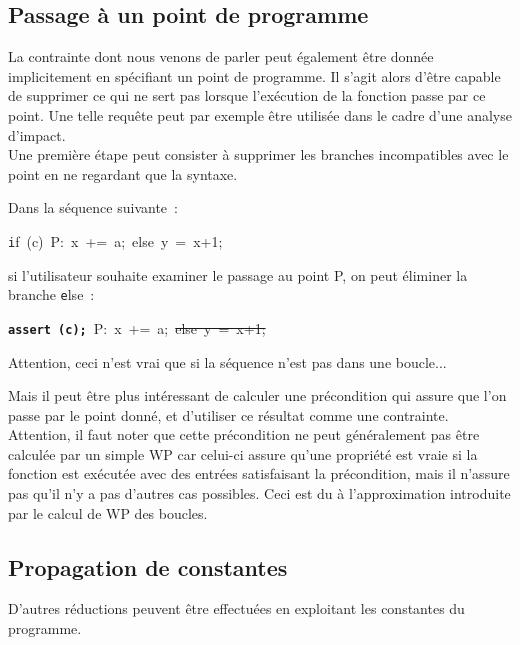 \subsection{Passage à un point de programme}

La contrainte dont nous venons de parler peut également être donnée
implicitement en spécifiant un point de programme. Il s'agit alors d'être
capable de supprimer ce qui ne sert pas lorsque l'exécution de la fonction passe
par ce point. Une telle requête peut par exemple être utilisée dans le cadre
d'une analyse d'impact.\\

Une première étape peut consister à supprimer les branches incompatibles avec le
point en ne regardant que la syntaxe.

\begin{exemple}
Dans la séquence suivante~:
\begin{center}
\mbox{\texttt if (c) P: x += a; else y = x+1;}
\end{center}
si l'utilisateur souhaite examiner le passage au
point P, on peut éliminer la branche {\texttt else}~:
\begin{center}
\mbox{\texttt {\bf assert (c);} P: x += a; \sout{else y = x+1;}}
\end{center}
Attention, ceci n'est vrai que si la séquence n'est pas dans une boucle...
\end{exemple}

Mais il peut être plus intéressant de calculer une précondition qui assure que
l'on passe par le point donné, et d'utiliser ce résultat comme une contrainte.\\

 Attention,
il faut noter que cette précondition ne peut généralement pas être
calculée par un simple WP car celui-ci assure qu'une propriété est vraie
si la fonction est exécutée avec des entrées satisfaisant la précondition,
mais il n'assure pas qu'il n'y a pas d'autres cas possibles.
Ceci est du à l'approximation introduite par le calcul de WP des boucles.

\subsection{Propagation de constantes}

D'autres réductions peuvent être effectuées en exploitant
les constantes du programme.

